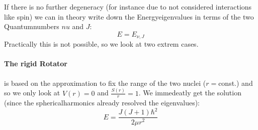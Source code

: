 If there is no further degeneracy (for instance due to not
considered interactions like spin) we can in theory write
down the Energyeigenvalues in terms of the two Quantumnumbers
$nu$ and $J$:
\begin{equation}
    E = E_{\nu,J}
\end{equation}
Practically this is not possible, so we look at two extrem cases.
\paragraph{The rigid Rotator} is based on the approximation to
fix the range of the two nuclei ($r =$const.) and so we only
look at $V(r)=0$ and $\frac{S(r)}{r} = 1$. We immedeatly get
the solution (since the sphericalharmonics already resolved
the eigenvalues):
\begin{equation}
    E = \frac{J(J+1)\hbar^2}{2\mu r^2}
\end{equation}
